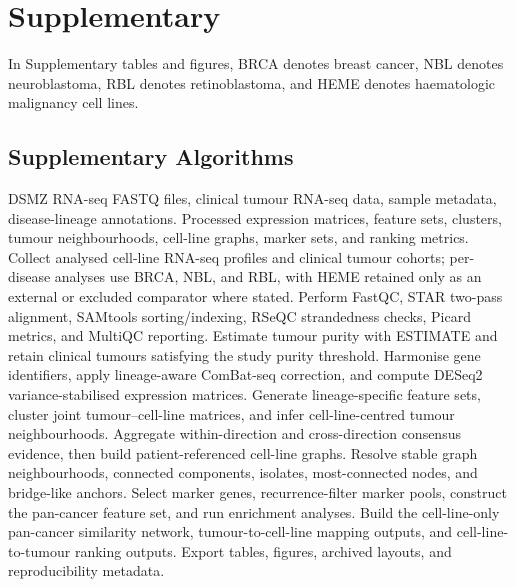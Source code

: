 \section*{Supplementary}

\setcounter{figure}{0}
\renewcommand{\thefigure}{S\arabic{figure}}
\providecommand{\theHfigure}{\thefigure}
\renewcommand{\theHfigure}{S\arabic{figure}}

\setcounter{table}{0}
\renewcommand{\thetable}{S\arabic{table}}
\providecommand{\theHtable}{\thetable}
\renewcommand{\theHtable}{S\arabic{table}}

\setcounter{algorithm}{0}
\renewcommand{\thealgorithm}{S\arabic{algorithm}}
\providecommand{\theHalgorithm}{\thealgorithm}
\renewcommand{\theHalgorithm}{S\arabic{algorithm}}


In Supplementary tables and figures, BRCA denotes breast cancer, NBL denotes neuroblastoma, RBL denotes retinoblastoma, and HEME denotes haematologic malignancy cell lines.

\subsection{Supplementary Algorithms}

\begin{algorithm}[H]
\caption{Holistic transcriptomic analysis workflow}
\label{alg:supp_holistic_workflow}
\small
\begin{algorithmic}[1]
\Require DSMZ RNA-seq FASTQ files, clinical tumour RNA-seq data, sample metadata, disease-lineage annotations.
\Ensure Processed expression matrices, feature sets, clusters, tumour neighbourhoods, cell-line graphs, marker sets, and ranking metrics.
\State Collect analysed cell-line RNA-seq profiles and clinical tumour cohorts; per-disease analyses use BRCA, NBL, and RBL, with HEME retained only as an external or excluded comparator where stated.
\State Perform FastQC, STAR two-pass alignment, SAMtools sorting/indexing, RSeQC strandedness checks, Picard metrics, and MultiQC reporting.
\State Estimate tumour purity with ESTIMATE and retain clinical tumours satisfying the study purity threshold.
\State Harmonise gene identifiers, apply lineage-aware ComBat-seq correction, and compute DESeq2 variance-stabilised expression matrices.
\State Generate lineage-specific feature sets, cluster joint tumour--cell-line matrices, and infer cell-line-centred tumour neighbourhoods.
\State Aggregate within-direction and cross-direction consensus evidence, then build patient-referenced cell-line graphs.
\State Resolve stable graph neighbourhoods, connected components, isolates, most-connected nodes, and bridge-like anchors.
\State Select marker genes, recurrence-filter marker pools, construct the pan-cancer feature set, and run enrichment analyses.
\State Build the cell-line-only pan-cancer similarity network, tumour-to-cell-line mapping outputs, and cell-line-to-tumour ranking outputs.
\State Export tables, figures, archived layouts, and reproducibility metadata.
\end{algorithmic}
\end{algorithm}

